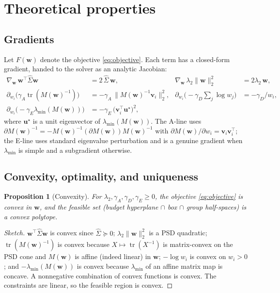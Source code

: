 \documentclass[11pt]{article}
\newcommand{\Sighat}{\hat\Sigma}
\newcommand{\tr}{\operatorname{tr}}
\newcommand{\w}{\mathbf{w}}
\newcommand{\vv}{\mathbf{v}}
\newcommand{\uu}{\mathbf{u}}
\newcommand{\M}{M(\w)}
\newcommand{\lammin}{\lambda_{\min}}
\newtheorem{proposition}{Proposition}
\begin{document}
\section{Theoretical properties}
\label{sec:theory}
\subsection{Gradients}
Let $F(\w)$ denote the objective \eqref{eq:objective}. Each term has a closed-form
gradient, handed to the solver as an analytic Jacobian:
\begin{align*}
  \nabla_{\w}\,\w^\top\Sighat\w &= 2\,\Sighat\,\w, &
  \nabla_{\w}\,\lambda_2\lVert\w\rVert_2^2 &= 2\lambda_2\,\w,\\
  \partial_{w_i}\big(\gamma_A\tr(\M^{-1})\big)
    &= -\gamma_A\,\lVert\M^{-1}\vv_i\rVert_2^2, &
  \partial_{w_i}\big({-}\gamma_D\textstyle\sum_j\log w_j\big) &= -\gamma_D/w_i,\\
  \partial_{w_i}\big({-}\gamma_E\lammin(\M)\big)
    &= -\gamma_E\,\big(\vv_i^\top\uu^\star\big)^2, &&
\end{align*}
where $\uu^\star$ is a unit eigenvector of $\lammin(\M)$. The A-line uses
$\partial\M^{-1}=-\M^{-1}(\partial\M)\M^{-1}$ with $\partial\M/\partial w_i=\vv_i\vv_i^\top$;
the E-line uses standard eigenvalue perturbation and is a genuine gradient when
$\lammin$ is simple and a subgradient otherwise.

\subsection{Convexity, optimality, and uniqueness}
\begin{proposition}[Convexity]
For $\lambda_2,\gamma_A,\gamma_D,\gamma_E\ge0$, the objective \eqref{eq:objective}
is convex in $\w$, and the feasible set (budget hyperplane $\cap$ box $\cap$ group
half-spaces) is a convex polytope.
\end{proposition}
\begin{proof}[Sketch]
$\w^\top\Sighat\w$ is convex since $\Sighat\succeq0$; $\lambda_2\lVert\w\rVert_2^2$
is a PSD quadratic; $\tr(\M^{-1})$ is convex because $X\mapsto\tr(X^{-1})$ is
matrix-convex on the PSD cone and $\M$ is affine (indeed linear) in $\w$;
$-\log w_i$ is convex on $w_i>0$; and $-\lammin(\M)$ is convex because $\lammin$ of
an affine matrix map is concave. A nonnegative combination of convex functions is
convex. The constraints are linear, so the feasible region is convex.
\end{proof}
\end{document}
